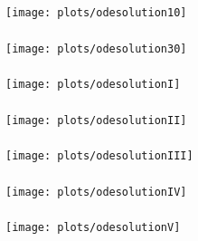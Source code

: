 \documentclass[
    8pt,
    aspectratio=1610,
    c,
    intlimits,
    leqno,
    professionalfonts,
]{beamer}
\begin{document}
\begin{frame}[fragile]
	\frametitle{\secname}

	\begin{figure}[ht!]
		\centering
		\texttt{[image: plots/odesolution10]}
		\caption{}
	\end{figure}
\end{frame}

\begin{frame}[fragile]
	\frametitle{\secname}

	\begin{figure}[ht!]
		\centering
		\texttt{[image: plots/odesolution30]}
		\caption{}
	\end{figure}
\end{frame}

\begin{frame}[fragile]
	\frametitle{\secname}

	\begin{figure}[ht!]
		\centering
		\texttt{[image: plots/odesolutionI]}
		\caption{}
	\end{figure}
\end{frame}

\begin{frame}[fragile]
	\frametitle{\secname}

	\begin{figure}[ht!]
		\centering
		\texttt{[image: plots/odesolutionII]}
		\caption{}
	\end{figure}
\end{frame}

\begin{frame}[fragile]
	\frametitle{\secname}

	\begin{figure}[ht!]
		\centering
		\texttt{[image: plots/odesolutionIII]}
		\caption{}
	\end{figure}
\end{frame}

\begin{frame}[fragile]
	\frametitle{\secname}

	\begin{figure}[ht!]
		\centering
		\texttt{[image: plots/odesolutionIV]}
		\caption{}
	\end{figure}
\end{frame}

\begin{frame}[fragile]
	\frametitle{\secname}

	\begin{figure}[ht!]
		\centering
		\texttt{[image: plots/odesolutionV]}
		\caption{}
	\end{figure}
\end{frame}
\end{document}
